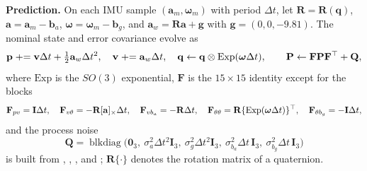 \noindent\textbf{Prediction.} On each IMU sample $(\mathbf{a}_m,\boldsymbol{\omega}_m)$ with period $\Delta t$, let $\mathbf{R}=\mathbf{R}(\mathbf{q})$, $\mathbf{a}=\mathbf{a}_m-\mathbf{b}_a$, $\boldsymbol{\omega}=\boldsymbol{\omega}_m-\mathbf{b}_g$, and $\mathbf{a}_w=\mathbf{R}\mathbf{a}+\mathbf{g}$ with $\mathbf{g}=(0,0,-9.81)$. The nominal state and error covariance evolve as
\begin{equation}\label{eq:eskfpred}
  \mathbf{p}\mathrel{+}=\mathbf{v}\Delta t+\tfrac12\mathbf{a}_w\Delta t^2,\quad
  \mathbf{v}\mathrel{+}=\mathbf{a}_w\Delta t,\quad
  \mathbf{q}\leftarrow\mathbf{q}\otimes\mathrm{Exp}(\boldsymbol{\omega}\Delta t),\qquad
  \mathbf{P}\leftarrow\mathbf{F}\mathbf{P}\mathbf{F}^{\top}+\mathbf{Q},
\end{equation}
where $\mathrm{Exp}$ is the $SO(3)$ exponential, $\mathbf{F}$ is the $15\times15$ identity except for the blocks
\begin{equation*}
  \mathbf{F}_{pv}=\mathbf{I}\Delta t,\quad
  \mathbf{F}_{v\theta}=-\mathbf{R}[\mathbf{a}]_\times\Delta t,\quad
  \mathbf{F}_{vb_a}=-\mathbf{R}\Delta t,\quad
  \mathbf{F}_{\theta\theta}=\mathbf{R}\{\mathrm{Exp}(\boldsymbol{\omega}\Delta t)\}^{\top},\quad
  \mathbf{F}_{\theta b_g}=-\mathbf{I}\Delta t,
\end{equation*}
and the process noise
\begin{equation*}
  \mathbf{Q}=\operatorname{blkdiag}\big(\mathbf{0}_{3},\ \sigma_a^2\Delta t^2\mathbf{I}_3,\ \sigma_g^2\Delta t^2\mathbf{I}_3,\ \sigma_{b_a}^2\Delta t\,\mathbf{I}_3,\ \sigma_{b_g}^2\Delta t\,\mathbf{I}_3\big)
\end{equation*}
is built from , , , and ; $\mathbf{R}\{\cdot\}$ denotes the rotation matrix of a quaternion.

